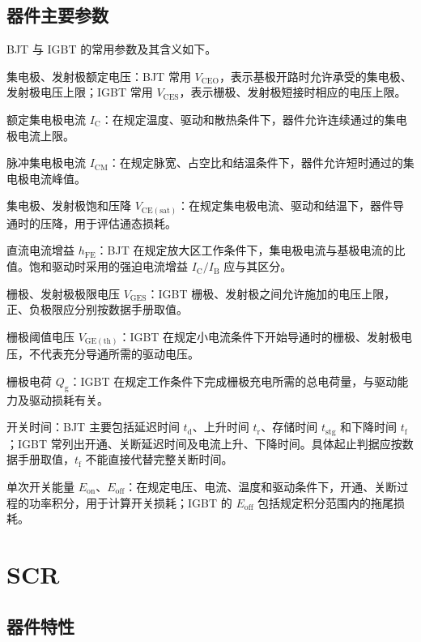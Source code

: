 \subsection{器件主要参数}

BJT 与 IGBT 的常用参数及其含义如下。

集电极、发射极额定电压：BJT 常用 $V_{\mathrm{CEO}}$，表示基极开路时允许承受的集电极、发射极电压上限；IGBT 常用 $V_{\mathrm{CES}}$，表示栅极、发射极短接时相应的电压上限。

额定集电极电流 $I_{\mathrm C}$：在规定温度、驱动和散热条件下，器件允许连续通过的集电极电流上限。

脉冲集电极电流 $I_{\mathrm{CM}}$：在规定脉宽、占空比和结温条件下，器件允许短时通过的集电极电流峰值。

集电极、发射极饱和压降 $V_{\mathrm{CE(sat)}}$：在规定集电极电流、驱动和结温下，器件导通时的压降，用于评估通态损耗。

直流电流增益 $h_{\mathrm{FE}}$：BJT 在规定放大区工作条件下，集电极电流与基极电流的比值。饱和驱动时采用的强迫电流增益 $I_{\mathrm C}/I_{\mathrm B}$ 应与其区分。

栅极、发射极极限电压 $V_{\mathrm{GES}}$：IGBT 栅极、发射极之间允许施加的电压上限，正、负极限应分别按数据手册取值。

栅极阈值电压 $V_{\mathrm{GE(th)}}$：IGBT 在规定小电流条件下开始导通时的栅极、发射极电压，不代表充分导通所需的驱动电压。

栅极电荷 $Q_{\mathrm g}$：IGBT 在规定工作条件下完成栅极充电所需的总电荷量，与驱动能力及驱动损耗有关。

开关时间：BJT 主要包括延迟时间 $t_{\mathrm d}$、上升时间 $t_{\mathrm r}$、存储时间 $t_{\mathrm{stg}}$ 和下降时间 $t_{\mathrm f}$；IGBT 常列出开通、关断延迟时间及电流上升、下降时间。具体起止判据应按数据手册取值，$t_{\mathrm f}$ 不能直接代替完整关断时间。

单次开关能量 $E_{\mathrm{on}}$、$E_{\mathrm{off}}$：在规定电压、电流、温度和驱动条件下，开通、关断过程的功率积分，用于计算开关损耗；IGBT 的 $E_{\mathrm{off}}$ 包括规定积分范围内的拖尾损耗。

\newpage{}

\section{SCR}

\subsection{器件特性}

